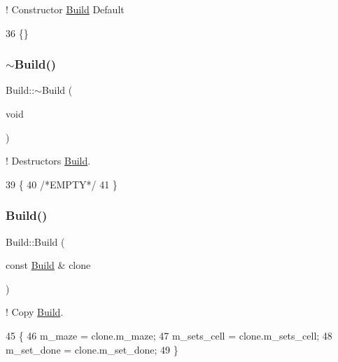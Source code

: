 ! Constructor \hyperlink{classBuild}{Build} Default 


\begin{DoxyCode}
36 \{\}
\end{DoxyCode}
\mbox{\label{classBuild_a7fc2f29804f9dc29b640838b515841e8}} 
\subsubsection{\texorpdfstring{$\sim$\+Build()}{~Build()}}
{\footnotesize\ttfamily Build\+::$\sim$\+Build (\begin{DoxyParamCaption}\item[{void}]{ }\end{DoxyParamCaption})\hspace{0.3cm}{\ttfamily [inline]}}



! Destructors \hyperlink{classBuild}{Build}. 


\begin{DoxyCode}
39         \{
40             \textcolor{comment}{/*EMPTY*/}
41         \}
\end{DoxyCode}
\mbox{\label{classBuild_aeadb5e6bafcfb4e7811bbd434ac5c663}} 
\subsubsection{\texorpdfstring{Build()}{Build()}\hspace{0.1cm}{\footnotesize\ttfamily [3/3]}}
{\footnotesize\ttfamily Build\+::\+Build (\begin{DoxyParamCaption}\item[{const \hyperlink{classBuild}{Build} \&}]{clone }\end{DoxyParamCaption})\hspace{0.3cm}{\ttfamily [inline]}}



! Copy \hyperlink{classBuild}{Build}. 


\begin{DoxyCode}
45         \{
46             m\_maze = clone.m\_maze;
47             m\_sets\_cell = clone.m\_sets\_cell;
48             m\_set\_done = clone.m\_set\_done;
49         \}
\end{DoxyCode}


